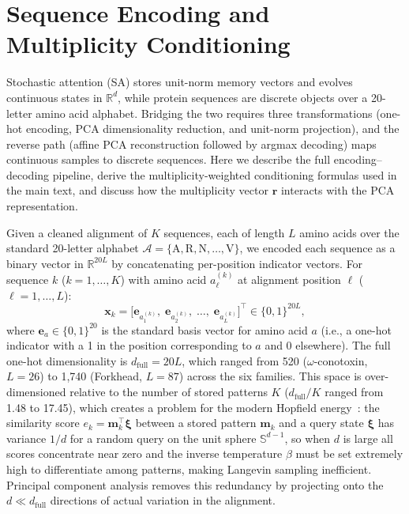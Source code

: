 \providecommand{\PaperRoot}{.}
\providecommand{\MainRef}[1]{\ref{#1}}
\providecommand{\MainEqRef}[1]{\eqref{#1}}

\section{Sequence Encoding and Multiplicity Conditioning}\label{app:pca}

Stochastic attention (SA) stores unit-norm memory vectors and evolves continuous
states in $\mathbb{R}^d$, while protein sequences are discrete objects over a
20-letter amino acid alphabet. Bridging the two requires three transformations
(one-hot encoding, PCA dimensionality reduction, and unit-norm projection), and the reverse path
(affine PCA reconstruction followed by argmax decoding) maps continuous samples
to discrete sequences. Here we describe the full encoding--decoding pipeline,
derive the multiplicity-weighted conditioning formulas used in the main text,
and discuss how the multiplicity vector $\mathbf{r}$ interacts with the PCA
representation.

Given a cleaned alignment of $K$ sequences, each of length $L$ amino acids
over the standard 20-letter alphabet
$\mathcal{A} = \{\text{A}, \text{R}, \text{N}, \ldots, \text{V}\}$, we
encoded each sequence as a binary vector in $\mathbb{R}^{20L}$ by
concatenating per-position indicator vectors. For sequence $k$ ($k = 1,
\ldots, K$) with amino acid $a_\ell^{(k)}$ at alignment position $\ell$
($\ell = 1, \ldots, L$):
\begin{equation}
  \mathbf{x}_k = \bigl[\mathbf{e}_{a_1^{(k)}},\; \mathbf{e}_{a_2^{(k)}},\;
    \ldots,\; \mathbf{e}_{a_L^{(k)}}\bigr]^\top \in \{0,1\}^{20L},
\end{equation}
where $\mathbf{e}_a \in \{0,1\}^{20}$ is the standard basis vector for amino
acid $a$ (i.e., a one-hot indicator with a 1 in the position corresponding to
$a$ and 0 elsewhere). The full one-hot dimensionality is
$d_{\mathrm{full}} = 20L$, which ranged from 520 ($\omega$-conotoxin,
$L{=}26$) to 1{,}740 (Forkhead, $L{=}87$) across the six families. This space
is over-dimensioned relative to the number of stored patterns $K$
($d_{\mathrm{full}}/K$ ranged from 1.48 to 17.45), which creates a problem for
the modern Hopfield energy~\cite{ramsauerHopfieldNetworksAll2021}: the
similarity score $e_k = \mathbf{m}_k^\top\boldsymbol{\xi}$ between a stored
pattern $\mathbf{m}_k$ and a query state $\boldsymbol{\xi}$ has variance
$1/d$ for a random query on the unit sphere $\mathbb{S}^{d-1}$, so when $d$
is large all scores concentrate near zero and the inverse temperature $\beta$
must be set extremely high to differentiate among patterns, making Langevin
sampling inefficient. Principal component analysis removes this redundancy
by projecting onto the $d \ll d_{\mathrm{full}}$ directions of actual
variation in the alignment.

